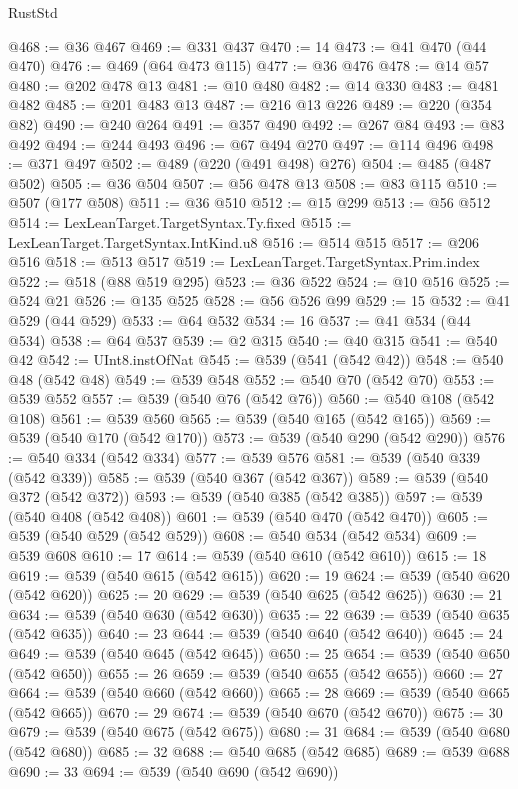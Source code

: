 \begin{lexlean}{RustStd}
\begin{coremodule}
@468 := @36 @467
@469 := @331 @437
@470 := 14
@473 := @41 @470 (@44 @470)
@476 := @469 (@64 @473 @115)
@477 := @36 @476
@478 := @14 @57
@480 := @202 @478 @13
@481 := @10 @480
@482 := @14 @330
@483 := @481 @482
@485 := @201 @483 @13
@487 := @216 @13 @226
@489 := @220 (@354 @82)
@490 := @240 @264
@491 := @357 @490
@492 := @267 @84
@493 := @83 @492
@494 := @244 @493
@496 := @67 @494 @270
@497 := @114 @496
@498 := @371 @497
@502 := @489 (@220 (@491 @498) @276)
@504 := @485 (@487 @502)
@505 := @36 @504
@507 := @56 @478 @13
@508 := @83 @115
@510 := @507 (@177 @508)
@511 := @36 @510
@512 := @15 @299
@513 := @56 @512
@514 := LexLeanTarget.TargetSyntax.Ty.fixed
@515 := LexLeanTarget.TargetSyntax.IntKind.u8
@516 := @514 @515
@517 := @206 @516
@518 := @513 @517
@519 := LexLeanTarget.TargetSyntax.Prim.index
@522 := @518 (@88 @519 @295)
@523 := @36 @522
@524 := @10 @516
@525 := @524 @21
@526 := @135 @525
@528 := @56 @526 @99
@529 := 15
@532 := @41 @529 (@44 @529)
@533 := @64 @532
@534 := 16
@537 := @41 @534 (@44 @534)
@538 := @64 @537
@539 := @2 @315
@540 := @40 @315
@541 := @540 @42
@542 := UInt8.instOfNat
@545 := @539 (@541 (@542 @42))
@548 := @540 @48 (@542 @48)
@549 := @539 @548
@552 := @540 @70 (@542 @70)
@553 := @539 @552
@557 := @539 (@540 @76 (@542 @76))
@560 := @540 @108 (@542 @108)
@561 := @539 @560
@565 := @539 (@540 @165 (@542 @165))
@569 := @539 (@540 @170 (@542 @170))
@573 := @539 (@540 @290 (@542 @290))
@576 := @540 @334 (@542 @334)
@577 := @539 @576
@581 := @539 (@540 @339 (@542 @339))
@585 := @539 (@540 @367 (@542 @367))
@589 := @539 (@540 @372 (@542 @372))
@593 := @539 (@540 @385 (@542 @385))
@597 := @539 (@540 @408 (@542 @408))
@601 := @539 (@540 @470 (@542 @470))
@605 := @539 (@540 @529 (@542 @529))
@608 := @540 @534 (@542 @534)
@609 := @539 @608
@610 := 17
@614 := @539 (@540 @610 (@542 @610))
@615 := 18
@619 := @539 (@540 @615 (@542 @615))
@620 := 19
@624 := @539 (@540 @620 (@542 @620))
@625 := 20
@629 := @539 (@540 @625 (@542 @625))
@630 := 21
@634 := @539 (@540 @630 (@542 @630))
@635 := 22
@639 := @539 (@540 @635 (@542 @635))
@640 := 23
@644 := @539 (@540 @640 (@542 @640))
@645 := 24
@649 := @539 (@540 @645 (@542 @645))
@650 := 25
@654 := @539 (@540 @650 (@542 @650))
@655 := 26
@659 := @539 (@540 @655 (@542 @655))
@660 := 27
@664 := @539 (@540 @660 (@542 @660))
@665 := 28
@669 := @539 (@540 @665 (@542 @665))
@670 := 29
@674 := @539 (@540 @670 (@542 @670))
@675 := 30
@679 := @539 (@540 @675 (@542 @675))
@680 := 31
@684 := @539 (@540 @680 (@542 @680))
@685 := 32
@688 := @540 @685 (@542 @685)
@689 := @539 @688
@690 := 33
@694 := @539 (@540 @690 (@542 @690))

\end{coremodule}
\end{lexlean}
